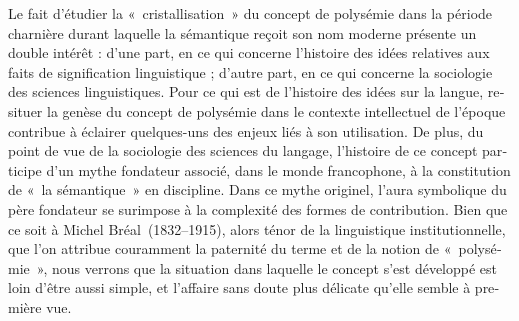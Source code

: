 \documentclass[output=paper]{langsci/langscibook}
\begin{document}
\begin{otherlanguage}{french}
Le fait d’étudier la «~cristallisation~» du concept de polysémie dans la période charnière durant laquelle la sémantique reçoit son nom moderne présente un double intérêt : d’une part, en ce qui concerne l’histoire des idées relatives aux faits de signification linguistique ; d’autre part, en ce qui concerne la sociologie des sciences linguistiques. Pour ce qui est de l’histoire des idées sur la langue, resituer la genèse du concept de polysémie dans le contexte intellectuel de l’époque contribue à éclairer quelques-uns des enjeux liés à son utilisation. De plus, du point de vue de la sociologie des sciences du langage, l’histoire de ce concept participe d’un mythe fondateur associé, dans le monde francophone, à la constitution de «~la sémantique~» en discipline. Dans ce mythe originel, l’aura symbolique du père fondateur se surimpose à la complexité des formes de contribution. Bien que ce soit à Michel Bréal~(1832--1915), alors ténor de la linguistique institutionnelle, que l’on attribue couramment la paternité du terme et de la notion de «~polysémie~», nous verrons que la situation dans laquelle le concept s’est développé est loin d’être aussi simple, et l’affaire sans doute plus délicate qu’elle semble à première vue.
 

\end{otherlanguage}
\end{document}

